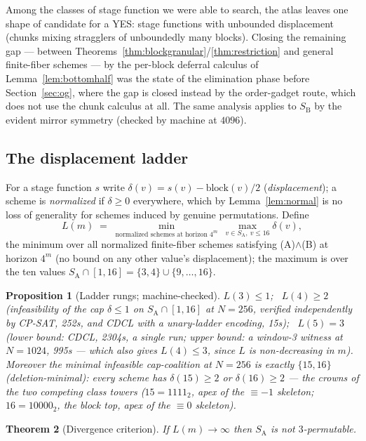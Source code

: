 \documentclass[11pt]{article}
\newtheorem{theorem}{Theorem}
\newtheorem{proposition}[theorem]{Proposition}
\theoremstyle{definition}
\newcommand{\SA}{S_{\mathrm{A}}}
\newcommand{\SB}{S_{\mathrm{B}}}
\begin{document}
\medskip
Among the classes of stage function we were able to search, the atlas
leaves one shape of candidate for a YES: stage functions
with unbounded displacement (chunks mixing stragglers of unboundedly many
blocks). Closing the remaining gap --- between
Theorems~\ref{thm:blockgranular}/\ref{thm:restriction} and general
finite-fiber schemes --- by the per-block deferral calculus of
Lemma~\ref{lem:bottomhalf} was the state of the elimination phase before
Section~\ref{sec:og}, where the gap is closed instead by the order-gadget
route, which does not use the chunk calculus at all. The same analysis
applies to $\SB{}$ by the evident mirror symmetry (checked by machine at
$4096$).

\subsection{The displacement ladder}\label{sec:ladder}

For a stage function $s$ write $\delta(v) = s(v) - \mathrm{block}(v)/2$
(\emph{displacement}); a scheme is \emph{normalized} if $\delta \ge 0$
everywhere, which by Lemma~\ref{lem:normal} is no loss of generality for
schemes induced by genuine permutations. Define
\[
L(m) \;=\; \min_{\text{normalized schemes at horizon } 4^m}\
\max_{v \in \SA,\ v \le 16} \delta(v),
\]
the minimum over all normalized finite-fiber schemes satisfying
(A)$\wedge$(B) at horizon $4^m$ (no bound on any other value's
displacement); the maximum is over the ten values
$\SA \cap [1,16] = \{3,4\} \cup \{9, \dots, 16\}$.

\begin{proposition}[Ladder rungs; machine-checked]
$L(3) \le 1$; \ $L(4) \ge 2$ (infeasibility of the cap $\delta \le 1$ on
$\SA \cap [1,16]$ at $N=256$, verified independently by CP-SAT, 252s, and
CDCL with a unary-ladder encoding, 15s); \ $L(5) = 3$ (lower bound: CDCL,
2304s, a single run; upper bound: a window-3 witness at $N=1024$, 995s ---
which also gives $L(4) \le 3$, since $L$ is non-decreasing in $m$).
Moreover the minimal infeasible cap-coalition at $N=256$ is exactly
$\{15, 16\}$ (deletion-minimal): every scheme has $\delta(15) \ge 2$ or
$\delta(16) \ge 2$ --- the crowns of the two competing class towers
($15 = 1111_2$, apex of the $\equiv -1$ skeleton; $16 = 10000_2$, the block
top, apex of the $\equiv 0$ skeleton).
\end{proposition}

\begin{theorem}[Divergence criterion]\label{thm:divergence}
If $L(m) \to \infty$ then $\SA$ is not $3$-permutable.
\end{theorem}
\end{document}
